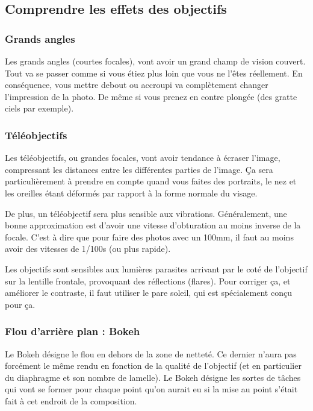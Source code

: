 \documentclass[a4paper,twoside]{article}
\begin{document}
\subsection{Comprendre les effets des objectifs}
\subsubsection{Grands angles}
Les grands angles (courtes focales), vont avoir un grand champ de vision couvert. Tout va se passer comme si vous étiez plus loin que vous ne l'êtes réellement. En conséquence, vous mettre debout ou accroupi va complètement changer l'impression de la photo. De même si vous prenez en contre plongée (des gratte ciels par exemple).

\subsubsection{Téléobjectifs}
Les téléobjectifs, ou grandes focales, vont avoir tendance à écraser l'image, compressant les distances entre les différentes parties de l'image. Ça sera particulièrement à prendre en compte quand vous faites des portraits, le nez et les oreilles étant déformés par rapport à la forme normale du visage. 

De plus, un téléobjectif sera plus sensible aux vibrations. Généralement, une bonne approximation est d'avoir une vitesse d'obturation au moins inverse de la focale. C'est à dire que pour faire des photos avec un 100mm, il faut au moins avoir des vitesses de 1/100s (ou plus rapide).

Les objectifs sont sensibles aux lumières parasites arrivant par le coté de l'objectif sur la lentille frontale, provoquant des réflections (flares). Pour corriger ça, et améliorer le contraste, il faut utiliser le pare soleil, qui est spécialement conçu pour ça.

\subsubsection{Flou d'arrière plan : Bokeh}
Le Bokeh désigne le flou en dehors de la zone de netteté. Ce dernier n'aura pas forcément le même rendu en fonction de la qualité de l'objectif (et en particulier du diaphragme et son nombre de lamelle). Le Bokeh désigne les sortes de tâches qui vont se former pour chaque point qu'on aurait eu si la mise au point s'était fait à cet endroit de la composition. 

\printindex
\end{document}
